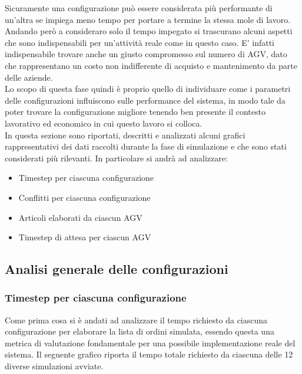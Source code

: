 \documentclass[12pt]{article}
\begin{document}
\noindent Sicuramente una configurazione può essere considerata più performante di un'altra se impiega meno tempo per portare a termine la stessa mole di lavoro. Andando però a consideraro solo il tempo impegato si trascurano alcuni aspetti che sono indispensabili per un'attività reale come in questo caso. E' infatti indispensabile trovare anche un giusto compromesso sul numero di AGV, dato che rappresentano un costo non indifferente di acquisto e mantenimento da parte delle aziende. \\

\noindent Lo scopo di questa fase quindi è proprio quello di individuare come i parametri delle configurazioni influiscono sulle performance del sistema, in modo tale da poter trovare la configurazione migliore tenendo ben presente il contesto lavorativo ed economico in cui questo lavoro si colloca. \\
\noindent In questa sezione sono riportati, descritti e analizzati alcuni grafici rappresentativi dei dati raccolti durante la fase di simulazione e che sono stati considerati più rilevanti. In particolare si andrà ad analizzare:\\

\begin{itemize}
\item Timestep per ciascuna configurazione
\item Conflitti per ciascuna configurazione
\item Articoli elaborati da ciascun AGV
\item Timestep di attesa per ciascun AGV
\end{itemize}

\newpage

\subsection{Analisi generale delle configurazioni}
\subsubsection{Timestep per ciascuna configurazione}
Come prima cosa si è andati ad analizzare il tempo richiesto da ciascuna configurazione per elaborare la lista di ordini simulata, essendo questa una metrica di valutazione fondamentale per una possibile implementazione reale del sistema. Il seguente grafico riporta il tempo totale richiesto da ciascuna delle 12 diverse simulazioni avviate. \\
\end{document}

